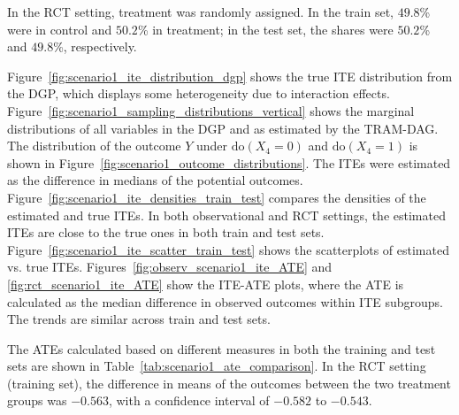 In the RCT setting, treatment was randomly assigned. In the train set, $49.8$\% were in control and $50.2$\% in treatment; in the test set, the shares were $50.2$\% and $49.8$\%, respectively.

Figure~\ref{fig:scenario1_ite_distribution_dgp} shows the true ITE distribution from the DGP, which displays some heterogeneity due to interaction effects. Figure~\ref{fig:scenario1_sampling_distributions_vertical} shows the marginal distributions of all variables in the DGP and as estimated by the TRAM-DAG. The distribution of the outcome $Y$ under $\text{do}(X_4 = 0)$ and $\text{do}(X_4 = 1)$ is shown in Figure~\ref{fig:scenario1_outcome_distributions}. The ITEs were estimated as the difference in medians of the potential outcomes. Figure~\ref{fig:scenario1_ite_densities_train_test} compares the densities of the estimated and true ITEs. In both observational and RCT settings, the estimated ITEs are close to the true ones in both train and test sets. Figure~\ref{fig:scenario1_ite_scatter_train_test} shows the scatterplots of estimated vs. true ITEs. Figures~\ref{fig:observ_scenario1_ite_ATE} and \ref{fig:rct_scenario1_ite_ATE} show the ITE-ATE plots, where the ATE is calculated as the median difference in observed outcomes within ITE subgroups. The trends are similar across train and test sets.



The ATEs calculated based on different measures in both the training and test sets are shown in Table~\ref{tab:scenario1_ate_comparison}. In the RCT setting (training set), the difference in means of the outcomes between the two treatment groups was 
$-0.563$, with a confidence interval of 
$-0.582$ to 
$-0.543$. 




